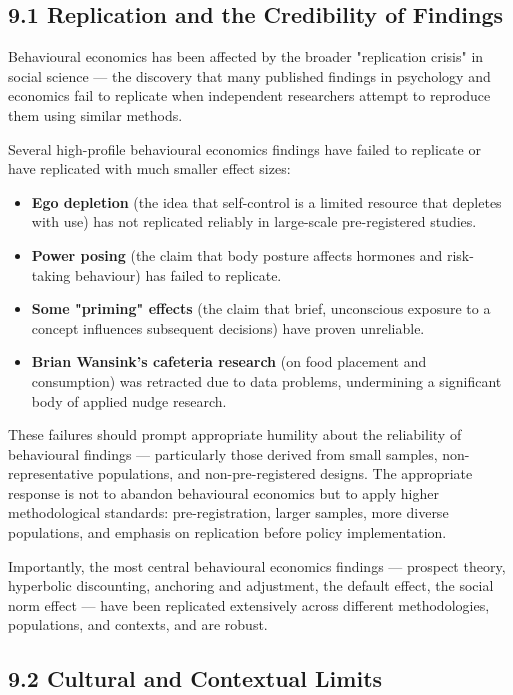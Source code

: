 \documentclass[12pt, letterpaper]{article}
\begin{document}
\subsection{9.1 Replication and the Credibility of Findings}


Behavioural economics has been affected by the broader "replication crisis" in social science --- the discovery that many published findings in psychology and economics fail to replicate when independent researchers attempt to reproduce them using similar methods.

Several high-profile behavioural economics findings have failed to replicate or have replicated with much smaller effect sizes:
\begin{itemize}
\item \textbf{Ego depletion} (the idea that self-control is a limited resource that depletes with use) has not replicated reliably in large-scale pre-registered studies.
\item \textbf{Power posing} (the claim that body posture affects hormones and risk-taking behaviour) has failed to replicate.
\item \textbf{Some "priming" effects} (the claim that brief, unconscious exposure to a concept influences subsequent decisions) have proven unreliable.
\item \textbf{Brian Wansink's cafeteria research} (on food placement and consumption) was retracted due to data problems, undermining a significant body of applied nudge research.
\end{itemize}

These failures should prompt appropriate humility about the reliability of behavioural findings --- particularly those derived from small samples, non-representative populations, and non-pre-registered designs. The appropriate response is not to abandon behavioural economics but to apply higher methodological standards: pre-registration, larger samples, more diverse populations, and emphasis on replication before policy implementation.

Importantly, the most central behavioural economics findings --- prospect theory, hyperbolic discounting, anchoring and adjustment, the default effect, the social norm effect --- have been replicated extensively across different methodologies, populations, and contexts, and are robust.


\subsection{9.2 Cultural and Contextual Limits}
\end{document}
